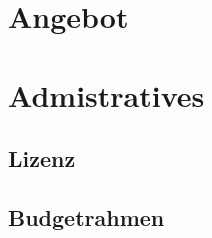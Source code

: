\documentclass[12pt]{article}
\theoremstyle{definition}
\begin{document}
\pagebreak

\section{Angebot}




\pagebreak

\section{Admistratives}

\subsection{Lizenz}

\subsection{Budgetrahmen}
\end{document}
